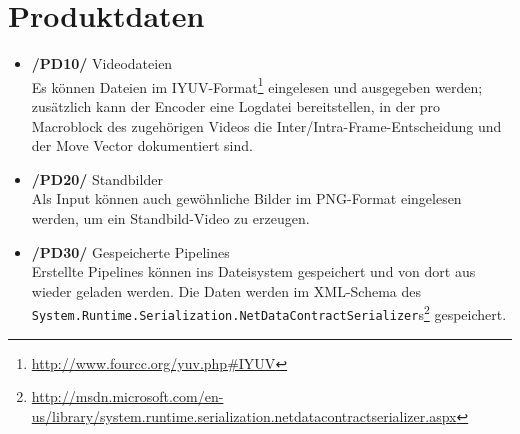 \section{Produktdaten}
\label{sec:produktdaten}

\begin{itemize}
	\item \textbf{/PD10/} Videodateien \\
        Es können Dateien im IYUV-Format\footnote{\url{http://www.fourcc.org/yuv.php\#IYUV}} eingelesen und ausgegeben werden; zusätzlich kann der Encoder eine Logdatei bereitstellen, in der pro Macroblock des zugehörigen Videos die Inter/Intra-Frame-Entscheidung und der Move Vector dokumentiert sind.
	\item \textbf{/PD20/} Standbilder \\
        Als Input können auch gewöhnliche Bilder im PNG-Format eingelesen werden, um ein Standbild-Video zu erzeugen.
	\item \textbf{/PD30/} Gespeicherte Pipelines \\
        \sloppy Erstellte Pipelines können ins Dateisystem gespeichert und von dort aus wieder geladen werden. Die Daten werden im XML-Schema des \texttt{System.Runtime.Serialization.NetDataContractSerializer}s\footnote{\url{http://msdn.microsoft.com/en-us/library/system.runtime.serialization.netdatacontractserializer.aspx}} gespeichert.
\end{itemize} \fussy
